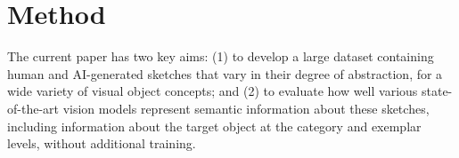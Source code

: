 \documentclass[10pt,letterpaper]{article}
\begin{document}





\section{Method}
The current paper has two key aims: 
(1) to develop a large dataset containing human and AI-generated sketches that vary in their degree of abstraction, for a wide variety of visual object concepts; 
and (2) to evaluate how well various state-of-the-art vision models represent semantic information about these sketches, including information about the target object at the category and exemplar levels, without additional training. 
\end{document}
